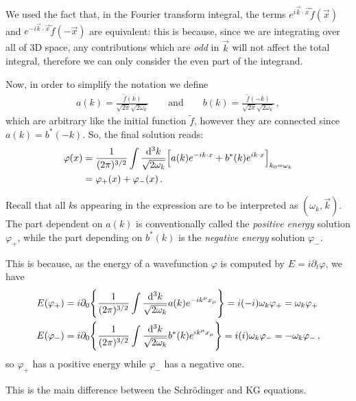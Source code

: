 \documentclass[main.tex]{subfiles}
\begin{document}
We used the fact that, in the Fourier transform integral, the terms \(e^{i \vec{k} \cdot \vec{x}} \widetilde{f} (\vec{x})\) and \(e^{-i \vec{k} \cdot \vec{x}} \widetilde{f}(- \vec{x})\) are equivalent: this is because, since we are integrating over all of 3D space, any contributions which are \emph{odd} in \(\vec{k}\) will not affect the total integral, therefore we can only consider the even part of the integrand. 

Now, in order to simplify the notation we define 
%
\begin{align}
a(k) = \frac{\widetilde{f}(k)}{\sqrt{2\pi } \sqrt{2 \omega_{k}}}
\qquad \text{and} \qquad
b(k) = \frac{\widetilde{f} (-k)}{\sqrt{2 \pi } \sqrt{2 \omega_{k}}}
\,,
\end{align}
%
which are arbitrary like the initial function \(\widetilde{f}\), however they are connected since \(a(k) = b^{*} (-k)\). 
So, the final solution reads: 
%
\begin{align}
\varphi (x) &= \frac{1}{(2 \pi )^{3/2}} \int \frac{ \dd[3]{k}}{\sqrt{2 \omega_{k}}} \qty[a(k) e^{-ik \cdot x} + b^{*}(k) e^{i k \cdot x}]_{k_0 = \omega_{k}}  \\
&= \varphi_{+}(x) + \varphi_{-}(x)
\,.
\end{align}

Recall that all \(k\)s appearing in the expression are to be interpreted as \((\omega_{k}, \vec{k})\). 
The part dependent on \(a(k)\) is conventionally called the \emph{positive energy} solution \(\varphi_{+}\), while the part depending on \(b^{*}(k)\) is the \emph{negative energy} solution \(\varphi_{-}\).

This is because, as the energy of a wavefunction \(\varphi \) is computed by \(E = i \partial_{t} \varphi \), we have 
%
\begin{align}
E (\varphi_{+}) &= i \partial_{0} \qty{
  \frac{1}{(2 \pi)^{3/2}} 
  \int \frac{ \dd[3]{k}}{\sqrt{2\omega_{k}}} a(k) e^{-i k^{\mu } x_{\mu }} 
} = i (-i) \omega_{k} \varphi_{+} = \omega_{k} \varphi_{+}  \\
E ( \varphi_{-}) &= i \partial_{0} \qty{
  \frac{1}{(2 \pi)^{3/2}} 
  \int \frac{ \dd[3]{k}}{\sqrt{2\omega_{k}}} b^{*}(k) e^{i k^{\mu } x_{\mu }} 
} = i (i) \omega_{k} \varphi_{-} =- \omega_{k} \varphi_{-}  
\,,
\end{align}
%
so \(\varphi_{+}\) has a positive energy while \(\varphi_{-}\) has a negative one. 

This is the main difference between the Schrödinger and KG equations. 
\end{document}
